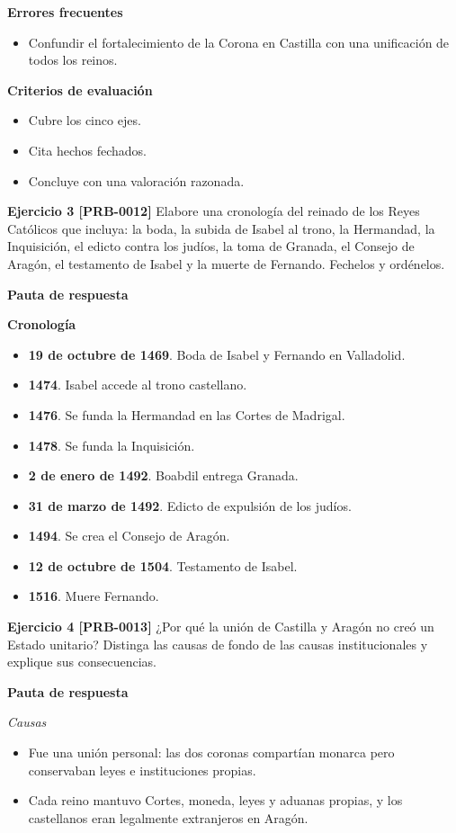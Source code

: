\documentclass{book}
\begin{document}
\noindent\textbf{Errores frecuentes}
\begin{itemize}
\item Confundir el fortalecimiento de la Corona en Castilla con una unificación de todos los reinos.
\end{itemize}

\noindent\textbf{Criterios de evaluación}
\begin{itemize}
\item Cubre los cinco ejes.
\item Cita hechos fechados.
\item Concluye con una valoración razonada.
\end{itemize}

\noindent\textbf{Ejercicio 3 [PRB-0012]}
Elabore una cronología del reinado de los Reyes Católicos que incluya: la boda, la subida de Isabel al trono, la Hermandad, la Inquisición, el edicto contra los judíos, la toma de Granada, el Consejo de Aragón, el testamento de Isabel y la muerte de Fernando. Fechelos y ordénelos.


\noindent\textbf{Pauta de respuesta}

\noindent\textbf{Cronología}
\begin{itemize}
\item \textbf{19 de octubre de 1469}. Boda de Isabel y Fernando en Valladolid.
\item \textbf{1474}. Isabel accede al trono castellano.
\item \textbf{1476}. Se funda la Hermandad en las Cortes de Madrigal.
\item \textbf{1478}. Se funda la Inquisición.
\item \textbf{2 de enero de 1492}. Boabdil entrega Granada.
\item \textbf{31 de marzo de 1492}. Edicto de expulsión de los judíos.
\item \textbf{1494}. Se crea el Consejo de Aragón.
\item \textbf{12 de octubre de 1504}. Testamento de Isabel.
\item \textbf{1516}. Muere Fernando.
\end{itemize}

\noindent\textbf{Ejercicio 4 [PRB-0013]}
¿Por qué la unión de Castilla y Aragón no creó un Estado unitario? Distinga las causas de fondo de las causas institucionales y explique sus consecuencias.


\noindent\textbf{Pauta de respuesta}

\noindent\textit{Causas}
\begin{itemize}
\item Fue una unión personal: las dos coronas compartían monarca pero conservaban leyes e instituciones propias.
\item Cada reino mantuvo Cortes, moneda, leyes y aduanas propias, y los castellanos eran legalmente extranjeros en Aragón.
\end{itemize}
\end{document}
